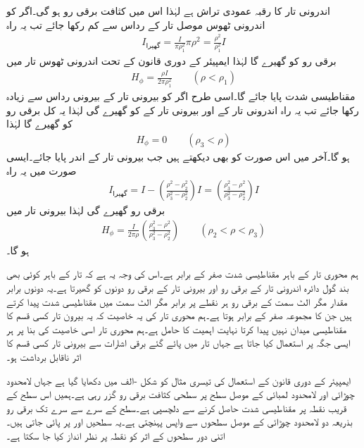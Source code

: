 اندرونی تار کا رقبہ عمودی تراش  ہے لہٰذا اس میں کثافت برقی رو  ہو گی۔اگر  کو اندرونی ٹھوس موصل تار کے رداس  سے کم رکھا جائے تب یہ راہ
\begin{align*}
I_{\textrm{گھیرا}}=\frac{I}{\pi \rho_1^2}\pi \rho^2=\frac{\rho^2}{\rho_1^2} I
\end{align*}
برقی رو کو گھیرے گا لہٰذا ایمپیئر کے دوری قانون کے تحت اندرونی ٹھوس تار میں
\begin{align*}
H_{\phi}=\frac{\rho I}{2\pi \rho_1^2} \quad \quad (\rho < \rho_1)
\end{align*}
مقناطیسی شدت پایا جائے گا۔اسی طرح اگر  کو بیرونی تار کے بیرونی رداس  سے زیادہ رکھا جائے تب یہ راہ اندرونی تار کے  اور بیرونی تار کے  کو گھیرے گی لہٰذا یہ  کل  برقی رو کو گھیرے گا لہٰذا 
\begin{align*}
H_{\phi} =0 \quad \quad (\rho_3 < \rho)
\end{align*}
ہو گا۔آخر میں اس صورت کو بھی دیکھتے ہیں جب  بیرونی تار کے اندر پایا جائے۔ایسی صورت میں یہ راہ
\begin{align*}
I_{\textrm{گھیرا}}=I-\left(\frac{\rho^2-\rho_2^2}{\rho_3^2-\rho_2^2}\right) I=\left(\frac{\rho_3^2-\rho^2}{\rho_3^2-\rho_2^2}\right)I
\end{align*}
برقی رو گھیرے گی لہٰذا بیرونی تار میں
\begin{align*}
H_{\phi}=\frac{I}{2\pi \rho} \left(\frac{\rho_3^2-\rho^2}{\rho_3^2-\rho_2^2} \right) \quad \quad (\rho_2<\rho<\rho_3)
\end{align*}
ہو گا۔ 

ہم محوری تار کے باہر مقناطیسی شدت صفر کے برابر ہے۔اس کی وجہ یہ ہے کہ تار کے باہر کوئی بھی بند گول دائرہ اندرونی تار کے برقی رو  اور بیرونی تار کے برقی رو  دونوں کو گھیرتا ہے۔یہ دونوں برابر مقدار مگر الٹ سمت کے برقی رو ہر نقطے پر برابر مگر الٹ سمت میں مقناطیسی شدت پیدا کرتے ہیں جن کا مجموعہ صفر کے برابر ہوتا ہے۔ہم محوری تار کی یہ خاصیت کہ یہ بیرون تار کسی قسم کا مقناطیسی میدان نہیں پیدا کرتا نہایت اہمیت کا حامل ہے۔ہم محوری تار اسی خاصیت کی بنا پر ہر ایسی جگہ پر استعمال کیا جاتا ہے جہاں تار میں پائے گئے برقی اشارات سے بیرونی تار کسی قسم کا اثر ناقابل برداشت ہو۔

ایمپیئر کے دوری قانون کے استعمال کی تیسری مثال کو شکل -الف میں دکھایا گیا ہے جہاں  لامحدود چوڑائی اور لامحدود لمبائی کے موصل سطح پر  سطحی کثافت برقی رو گزر رہی ہے۔ہمیں اس سطح کے قریب نقطہ  پر مقناطیسی شدت حاصل کرنے سے دلچسپی ہے۔سطح کے  سرے سے  سرے تک برقی رو بذریعہ دو لامحدود چوڑائی کے موصل سطحوں سے واپس پہنچتی ہے۔یہ سطحیں  اور  پر پائی جاتی ہیں۔اتنی دور سطحوں کے اثر کو نقطہ  پر نظر انداز کیا جا سکتا ہے۔

